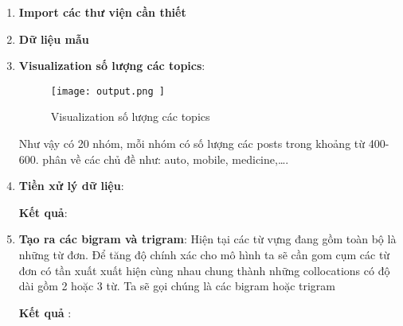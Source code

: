 \begin{enumerate}
	\item \textbf{Import các thư viện cần thiết}
	
	
	\item \textbf{Dữ liệu mẫu} %
	
	
	
	\item \textbf{Visualization số lượng các topics}:
		\begin{figure}[h!]
			\centering
			\texttt{[image: 
				output.png
			]}
			\caption[Visualization số lượng các topics]{
				Visualization số lượng các topics
			}
		\end{figure}
		Như vậy có 20 nhóm, mỗi nhóm có số lượng các posts trong khoảng từ 400-600. phân về các chủ đề như: auto, mobile, medicine,….
	\newpage
	\item \textbf{Tiền xử lý dữ liệu}:
	
	\textbf{Kết quả}:
	
	
	\item \textbf{Tạo ra các bigram và trigram}:
	Hiện tại các từ vựng đang gồm toàn bộ là những từ đơn. Để tăng độ chính xác cho mô hình ta sẽ cần gom cụm các từ đơn có tần xuất xuất hiện cùng nhau chung thành những collocations có độ dài gồm 2 hoặc 3 từ. Ta sẽ gọi chúng là các bigram hoặc trigram
	
	\textbf{Kết quả }: 
	
	

\end{enumerate}
